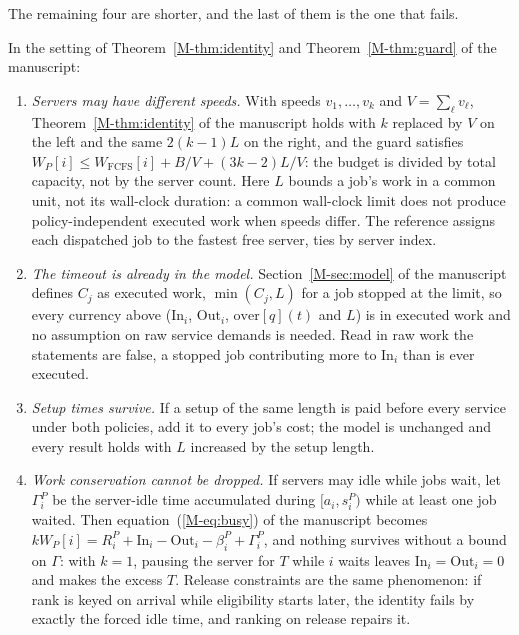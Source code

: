 \documentclass[mathematics,supfile,submit,moreauthors]{Definitions/mdpi}
\begin{document}
The remaining four are shorter, and the last of them is the one that fails.

\begin{proposition}[Relaxations]
\label{prop:relax}
In the setting of Theorem~\ref*{M-thm:identity} and Theorem~\ref*{M-thm:guard} of the manuscript:
\begin{enumerate}
\item \emph{Servers may have different speeds.} With speeds $v_1, \dots, v_k$
and $V = \sum_{\ell} v_{\ell}$, Theorem~\ref*{M-thm:identity} of the manuscript holds with $k$ replaced by
$V$ on the left and the same $2(k-1)L$ on the right, and the guard satisfies
$W_P[i] \le W_{\mathrm{FCFS}}[i] + B/V + (3k-2)L/V$: the budget is divided by
total capacity, not by the server count.
Here $L$ bounds a job's work in a common unit, not its wall-clock duration: a common
wall-clock limit does not produce policy-independent executed work when speeds
differ. The reference assigns each dispatched job to the fastest free server, ties
by server index.
\item \emph{The timeout is already in the model.} Section~\ref*{M-sec:model} of the manuscript defines
$C_j$ as executed work, $\min(C_j, L)$ for a job stopped at the limit, so every
currency above ($\mathrm{In}_i$, $\mathrm{Out}_i$, $\mathrm{over}[q](t)$ and
$L$) is in executed work and no assumption on raw service demands is needed.
Read in raw work the statements are false, a stopped job contributing more to
$\mathrm{In}_i$ than is ever executed.
\item \emph{Setup times survive.} If a setup of the same length is paid before
every service under both policies, add it to every job's cost; the model is unchanged
and every result holds with $L$ increased by the setup length.
\item \emph{Work conservation cannot be dropped.} If servers may idle while jobs
wait, let $\Gamma^P_i$ be the server-idle time accumulated during
$[a_i, s^P_i)$ while at least one job waited. Then equation~(\ref*{M-eq:busy}) of the manuscript
becomes
$k W_P[i] = R^P_i + \mathrm{In}_i - \mathrm{Out}_i - \beta^P_i + \Gamma^P_i$, and
nothing survives without a bound on $\Gamma$: with $k = 1$, pausing the server
for $T$ while $i$ waits leaves $\mathrm{In}_i = \mathrm{Out}_i = 0$ and makes
the excess $T$. Release constraints are the same phenomenon: if rank is keyed
on arrival while eligibility starts later, the identity fails by exactly the
forced idle time, and ranking on release repairs it.
\end{enumerate}
\end{proposition}
\end{document}
